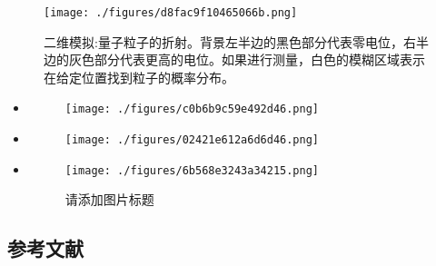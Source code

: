 \begin{figure}[ht]
\centering
\texttt{[image: ./figures/d8fac9f10465066b.png]}
\caption{二维模拟:量子粒子的折射。背景左半边的黑色部分代表零电位，右半边的灰色部分代表更高的电位。如果进行测量，白色的模糊区域表示在给定位置找到粒子的概率分布。} \label{fig_ZS_10}
\end{figure}

\begin{itemize}
\item \begin{figure}[ht]
\centering
\texttt{[image: ./figures/c0b6b9c59e492d46.png]}
\caption\label{fig_ZS_11}
\end{figure}

\item \begin{figure}[ht]
\centering
\texttt{[image: ./figures/02421e612a6d6d46.png]}
\caption\label{fig_ZS_12}
\end{figure}

\item \begin{figure}[ht]
\centering
\texttt{[image: ./figures/6b568e3243a34215.png]}
\caption{请添加图片标题} \label{fig_ZS_13}
\end{figure}

\end{itemize}


\subsection{参考文献}